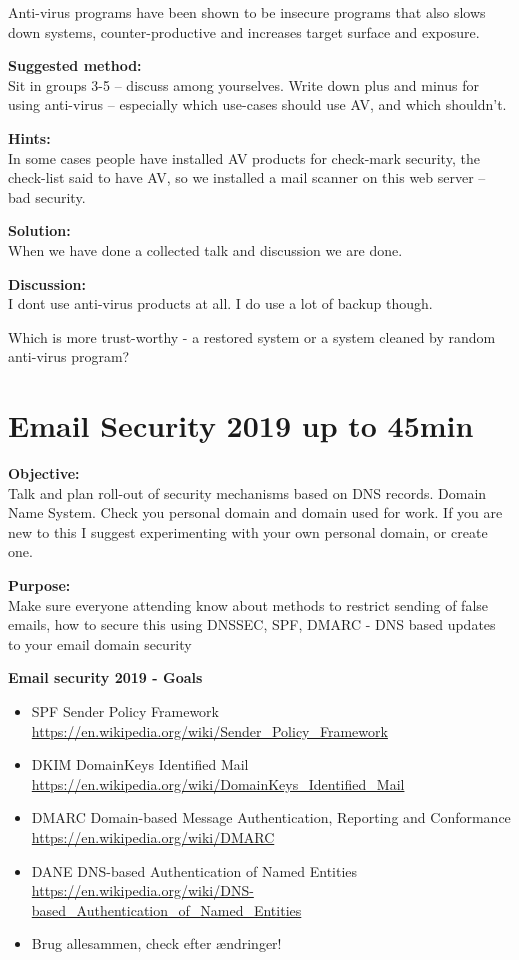 \documentclass[a4paper,11pt,notitlepage]{report}
\begin{document}
Anti-virus programs have been shown to be insecure programs that also slows down systems, counter-productive and increases target surface and exposure.

{\bf Suggested method:}\\
Sit in groups 3-5 -- discuss among yourselves. Write down plus and minus for using anti-virus -- especially which use-cases should use AV, and which shouldn't.

{\bf Hints:}\\
In some cases people have installed AV products for check-mark security, the check-list said to have AV, so we installed a mail scanner on this web server -- bad security.

{\bf Solution:}\\
When we have done a collected talk and discussion we are done.

{\bf Discussion:}\\
I dont use anti-virus products at all. I do use a lot of backup though.

Which is more trust-worthy - a restored system or a system cleaned by random anti-virus program?






\chapter{Email Security 2019 up to 45min}
\label{ex:email-security}

{\bf Objective:}\\
Talk and plan roll-out of security mechanisms based on DNS records. Domain Name System. Check you personal domain and domain used for work. If you are new to this I suggest experimenting with your own personal domain, or create one.

{\bf Purpose:}\\
Make sure everyone attending know about methods to restrict sending of false emails, how to secure this using DNSSEC, SPF, DMARC - DNS based updates to your email domain security


{\bf Email security 2019 - Goals}

\begin{itemize}
\item SPF Sender Policy Framework\\ {\footnotesize\url{https://en.wikipedia.org/wiki/Sender_Policy_Framework}}
\item DKIM DomainKeys Identified Mail\\
{\footnotesize\url{https://en.wikipedia.org/wiki/DomainKeys_Identified_Mail}}
\item DMARC Domain-based Message Authentication, Reporting and Conformance\\
{\footnotesize\url{https://en.wikipedia.org/wiki/DMARC}}
\item DANE DNS-based Authentication of Named Entities\\ {\footnotesize\url{https://en.wikipedia.org/wiki/DNS-based_Authentication_of_Named_Entities}}
\item Brug allesammen, check efter ændringer!
\end{itemize}
\end{document}
